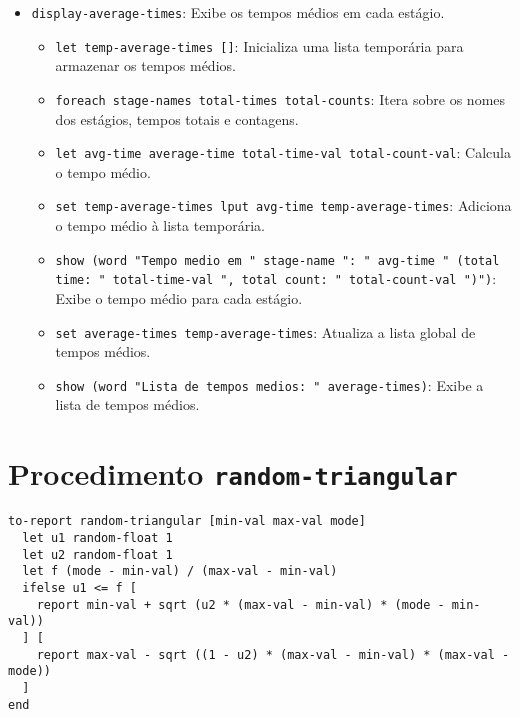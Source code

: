\documentclass{article}
\begin{document}
\begin{itemize}
    \item \texttt{display-average-times}: Exibe os tempos médios em cada estágio.
    \begin{itemize}
        \item \texttt{let temp-average-times []}: Inicializa uma lista temporária para armazenar os tempos médios.
        \item \texttt{foreach stage-names total-times total-counts}: Itera sobre os nomes dos estágios, tempos totais e contagens.
        \item \texttt{let avg-time average-time total-time-val total-count-val}: Calcula o tempo médio.
        \item \texttt{set temp-average-times lput avg-time temp-average-times}: Adiciona o tempo médio à lista temporária.
        \item \texttt{show (word "Tempo medio em " stage-name ": " avg-time " (total time: " total-time-val ", total count: " total-count-val ")")}: Exibe o tempo médio para cada estágio.
        \item \texttt{set average-times temp-average-times}: Atualiza a lista global de tempos médios.
        \item \texttt{show (word "Lista de tempos medios: " average-times)}: Exibe a lista de tempos médios.
    \end{itemize}
\end{itemize}

\section{Procedimento \texttt{random-triangular}}

\begin{lstlisting}[language=NetLogo]
to-report random-triangular [min-val max-val mode]
  let u1 random-float 1
  let u2 random-float 1
  let f (mode - min-val) / (max-val - min-val)
  ifelse u1 <= f [
    report min-val + sqrt (u2 * (max-val - min-val) * (mode - min-val))
  ] [
    report max-val - sqrt ((1 - u2) * (max-val - min-val) * (max-val - mode))
  ]
end
\end{lstlisting}
\end{document}
